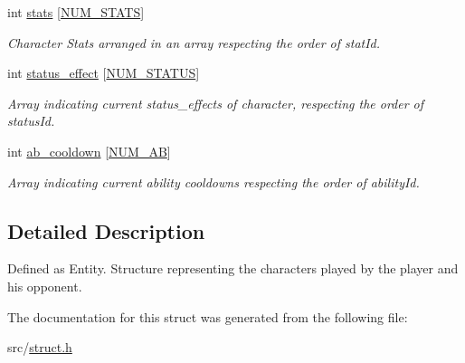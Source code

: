 \begin{DoxyCompactItemize}
int \hyperlink{structentity__t_ab609092b4a92813e695ef1023fd2c162}{stats} \mbox{[}\hyperlink{substruct_8h_a8dd66bb045cef1046c504653db25ccde}{N\+U\+M\+\_\+\+S\+T\+A\+TS}\mbox{]}
\begin{DoxyCompactList}\small\item\em Character Stats arranged in an array respecting the order of stat\+Id. \end{DoxyCompactList}\item 
\mbox{\label{structentity__t_a346fd34c9839a9ac920bfc9739deb7a4}} 
int \hyperlink{structentity__t_a346fd34c9839a9ac920bfc9739deb7a4}{status\+\_\+effect} \mbox{[}\hyperlink{substruct_8h_ae402e0b8f6d07e80d8c8a0eb3c87cf13}{N\+U\+M\+\_\+\+S\+T\+A\+T\+US}\mbox{]}
\begin{DoxyCompactList}\small\item\em Array indicating current status\+\_\+effects of character, respecting the order of status\+Id. \end{DoxyCompactList}\item 
\mbox{\label{structentity__t_afce601ac707563d26335adb3ec2f5995}} 
int \hyperlink{structentity__t_afce601ac707563d26335adb3ec2f5995}{ab\+\_\+cooldown} \mbox{[}\hyperlink{substruct_8h_ab0790753a89cc6be149f3c435e0c0c94}{N\+U\+M\+\_\+\+AB}\mbox{]}
\begin{DoxyCompactList}\small\item\em Array indicating current ability cooldowns respecting the order of ability\+Id. \end{DoxyCompactList}\end{DoxyCompactItemize}


\subsection{Detailed Description}
Defined as Entity. Structure representing the characters played by the player and his opponent. 

The documentation for this struct was generated from the following file\+:\begin{DoxyCompactItemize}
\item 
src/\hyperlink{struct_8h}{struct.\+h}\end{DoxyCompactItemize}
